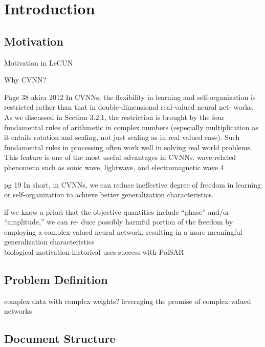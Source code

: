 \chapter{Introduction} \label{chap:intro}

\section{Motivation} \label{sect:thefirst}
Motivation in LeCUN

Why CVNN?

Page 38 akira 2012
 In CVNNs, the flexibility in learning and self-organization
is restricted rather than that in double-dimensional real-valued neural net-
works. As we discussed in Section 3.2.1, the restriction is brought by the four
fundamental rules of arithmetic in complex numbers (especially multiplication as it entails rotation and scaling, not just scaling as in real valued case). Such fundamental rules
in processing often work well in solving real world problems. This feature is
one of the most useful advantages in CVNNs. wave-related phenomena
such as sonic wave, lightwave, and electromagnetic wave.4

pg 19
In short, in CVNNs, we can reduce ineffective degree of freedom in
learning or self-organization to achieve better generalization characteristics.

 if we know a priori
that the objective quantities include “phase” and/or “amplitude,” we can re-
duce possibly harmful portion of the freedom by employing a complex-valued
neural network, resulting in a more meaningful generalization characteristics\\


biological motivation
historical uses
success with PolSAR




\section{Problem Definition} \label{sect:thefirst}
complex data with complex weights?
leveraging the promise of complex valued networks

\section{Document Structure} \label{sect:thefirst}


